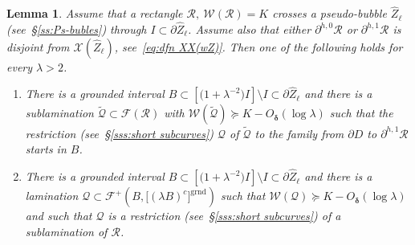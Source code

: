 \documentclass{amsart}
\newcommand{\1}{{\mathbb 1 }}
\newcommand{\FamQ}{{\mathcal Q}}
\newcommand{\Fam}{{\mathcal F}}
\newcommand{\Width}{{\mathcal W}}
\newcommand\RR{\mathcal{R}}
\newcommand\XX{\mathcal{X}}
\newcommand{\wZ}{{\widehat Z}}
\newcommand{\grnd}{{\operatorname{grnd}}}
\newtheorem{lem}[thm]{Lemma}
\theoremstyle{remark}
\numberwithin{equation}{section}
\theoremstyle{definition}
\newcommand{\bdelta}{{\boldsymbol{ \delta}}}
\begin{document}
\begin{lem}
\label{lem:rect rhrough PB}
Assume that a rectangle $\RR, \ \Width(\RR)=K$ crosses a pseudo-bubble $\wZ_\ell$ (see~\S\ref{ss:Ps-bubles}) through $I\subset \partial \wZ_\ell$. Assume also that either $\partial^{h,0}\RR$ or $\partial^{h,1} \RR$ is disjoint from $\XX(\wZ_\ell)$, see~\eqref{eq:dfn XX(wZ)}. Then one of the following holds for every $\lambda >2$.
\begin{enumerate}[label=\text{(\Roman*)},font=\normalfont,leftmargin=*]
\item\label{c1:lem:rect rhrough PB} There is a grounded interval $B\subset \left[\big(1+ \lambda^{-2}\big)I\right]\setminus I\subset \partial \wZ_\ell$ and there is a sublamination $\widetilde \FamQ\subset \Fam(\RR)$ with $\Width(\widetilde \FamQ)\succeq K-O_\bdelta(\log \lambda)$ such that the restriction (see~\S\ref{sss:short subcurves}) $\FamQ$ of $\widetilde \FamQ$ to the family from $\partial D$ to $\partial^{h,1}\RR$ starts in $B$.
\item\label{c2:lem:rect rhrough PB} There is a grounded interval $B\subset \left[\big(1+ \lambda^{-2}\big)I\right]\setminus I\subset \partial \wZ_\ell$ and there is a lamination $\FamQ\subset \Fam^+\left(B, \big[(\lambda B)^c \big]^\grnd\right)$ such that $\Width(\FamQ)\succeq K-O_\bdelta(\log \lambda)$ and such that $\FamQ$ is a restriction (see~\S\ref{sss:short subcurves}) of a sublamination of $\RR$.
\end{enumerate}
\end{lem}
\end{document}

